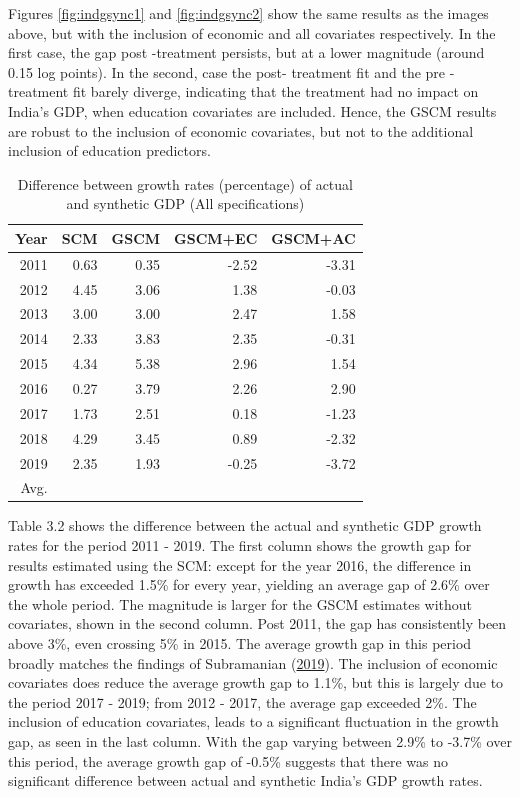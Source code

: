 \documentclass[12pt,nobind, a4paper]{reedthesis}
\begin{document}
 Figures \ref{fig:indgsync1} and \ref{fig:indgsync2} show the same results as the images above, but with the inclusion of economic and all covariates respectively. In the first case, the gap post -treatment persists, but at a lower magnitude (around 0.15 log points). In the second, case the post- treatment fit and the pre - treatment fit barely diverge, indicating that the treatment had no impact on India's GDP, when education covariates are included. Hence, the GSCM results are robust to the inclusion of economic covariates, but not to the additional inclusion of education predictors.
 \linebreak

 \newrobustcmd{\B}{\bfseries}
 \begin{table}[h!!]
 \centering
 \begin{tabular}{rrrrr}
 \hline
 Year & SCM & GSCM & GSCM+EC & GSCM+AC\\
 \hline
 2011 & 0.63 & 0.35 & -2.52 & -3.31\\
 \hline
 2012 & 4.45 & 3.06 & 1.38 & -0.03\\
 \hline
 2013 & 3.00 & 3.00 & 2.47 & 1.58\\
 \hline
 2014 & 2.33 & 3.83 & 2.35 & -0.31\\
 \hline
 2015 & 4.34 & 5.38 & 2.96 & 1.54\\
 \hline
 2016 & 0.27 & 3.79 & 2.26 & 2.90\\
 \hline
 2017 & 1.73 & 2.51 & 0.18 & -1.23\\
 \hline
 2018 & 4.29 & 3.45 & 0.89 & -2.32\\
 \hline
 2019 & 2.35 & 1.93 & -0.25 & -3.72\\
 \hline
 \B Avg. & \B 2.6 & \B 3.0 & \B 1.1& \B -0.5\\
 \hline
 \end{tabular}
 \caption{Difference between growth rates (percentage) of actual and synthetic GDP (All specifications)}
 \end{table}
 Table 3.2 shows the difference between the actual and synthetic GDP growth rates for the period 2011 - 2019. The first column shows the growth gap for results estimated using the SCM: except for the year 2016, the difference in growth has exceeded 1.5\% for every year, yielding an average gap of 2.6\% over the whole period. The magnitude is larger for the GSCM estimates without covariates, shown in the second column. Post 2011, the gap has consistently been above 3\%, even crossing 5\% in 2015. The average growth gap in this period broadly matches the findings of Subramanian (\protect\hyperlink{ref-subramanian_indias_2019}{2019}). The inclusion of economic covariates does reduce the average growth gap to 1.1\%, but this is largely due to the period 2017 - 2019; from 2012 - 2017, the average gap exceeded 2\%. The inclusion of education covariates, leads to a significant fluctuation in the growth gap, as seen in the last column. With the gap varying between 2.9\% to -3.7\% over this period, the average growth gap of -0.5\% suggests that there was no significant difference between actual and synthetic India's GDP growth rates.
\end{document}
